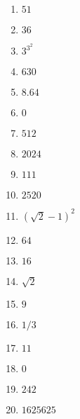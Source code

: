 \documentclass[a4paper,12pt]{exam}
\begin{document}
\begin{questions}
\end{questions}
\pagebreak
\begin{enumerate}
\item \(51\)
\item \(36\)
\item \(3^{3^2}\)
\item \(630\)
\item \(8.64\)
\item \(0\)
\item \(512\)
\item \(2024\)
\item \(111\)
\item \(2520\)
\item \((\sqrt2-1)^2\)
\item \(64\)
\item \(16\)
\item \(\sqrt2\)
\item \(9\)
\item \(1/3\)
\item \(11\)
\item \(0\)
\item \(242\)
\item \(1625625\)
\end{enumerate}
\end{document}
